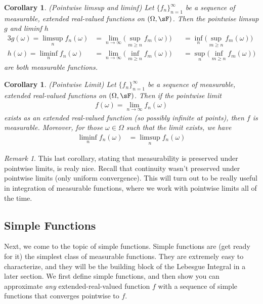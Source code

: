 \documentclass[12pt]{article}
\theoremstyle{plain}
\newtheorem{cor}[thm]{Corollary}
\theoremstyle{definition}
\theoremstyle{remark}
\newtheorem*{rmk}{Remark}
\newcommand{\ninf}{_{n=1}^\infty}
\newcommand{\limn}{\lim_{n\rightarrow\infty}}
\begin{document}
\begin{cor}\emph{(Pointwise limsup and liminf)}
Let $\{f_n\}\ninf$ be a sequence of measurable, extended real-valued
functions on $(\Omega,\sF)$. Then the pointwise limsup $g$ and liminf
$h$
\begin{alignat*}{3}
  g(\omega) =
  \limsup_n f_n(\omega)
  &= \limn \bigg(\sup_{m\geq n} f_m(\omega) \bigg)
  &&=
    \inf_n\bigg(\sup_{m\geq n} f_m(\omega)\bigg) \\
  h(\omega) =
  \liminf_n f_n(\omega)
  &= \limn \bigg(\inf_{m\geq n} f_m(\omega) \bigg)
  &&= \sup_n\bigg(\inf_{m\geq n} f_m(\omega)\bigg)
\end{alignat*}
are both measurable functions.
\end{cor}

\begin{cor}\emph{(Pointwise Limit)}
Let $\{f_n\}\ninf$ be a sequence of measurable, extended real-valued
functions on $(\Omega,\sF)$. Then if the pointwise limit
\begin{align*}
  f(\omega) = \limn f_n(\omega)
\end{align*}
exists as an extended real-valued function (so possibly infinite at
points), then $f$ is measurable.
Moreover, for those $\omega\in\Omega$ such that the limit exists, we
have
\begin{align*}
  \liminf_n f_n(\omega)
  &=
  \limsup_n f_n(\omega)
\end{align*}
\end{cor}
\begin{rmk}
This last corollary, stating that measurability is preserved under
pointwise limits, is realy nice. Recall that continuity wasn't preserved
under pointwise limits (only uniform convergence). This will turn out to
be really useful in integration of measurable functions, where we work
with pointwise limits all of the time.
\end{rmk}


\clearpage
\subsection{Simple Functions}

Next, we come to the topic of simple functions. Simple functions are
(get ready for it) the simplest class of measurable functions. They are
extremely easy to characterize, and they will be the building block of
the Lebesgue Integral in a later section. We first define simple
functions, and then show you can approximate \emph{any}
extended-real-valued function $f$ with a sequence of simple functions
that converges pointwise to $f$.
\end{document}
